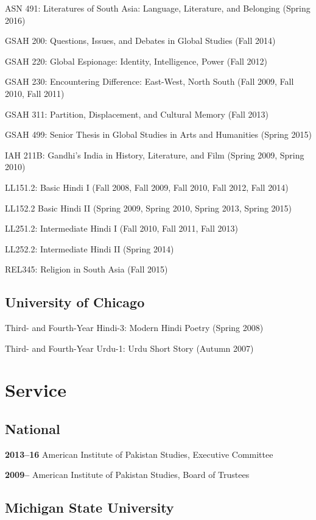 \documentclass[letterpaper,12pt]{article}
\begin{document}
ASN 491: Literatures of South Asia: Language, Literature, and Belonging (Spring 2016)

GSAH 200: Questions, Issues, and Debates in Global Studies (Fall 2014)

GSAH 220: Global Espionage: Identity, Intelligence, Power (Fall 2012)

GSAH 230: Encountering Difference: East-West, North South (Fall 2009, Fall 2010, Fall 2011)

GSAH 311: Partition, Displacement, and Cultural Memory (Fall 2013)

GSAH 499: Senior Thesis in Global Studies in Arts and Humanities (Spring 2015)

IAH 211B: Gandhi’s India in History, Literature, and Film (Spring 2009, Spring 2010)

LL151.2: Basic Hindi I (Fall 2008, Fall 2009, Fall 2010, Fall 2012, Fall 2014)

LL152.2 Basic Hindi II (Spring 2009, Spring 2010, Spring 2013, Spring 2015)

LL251.2: Intermediate Hindi I (Fall 2010, Fall 2011, Fall 2013)

LL252.2: Intermediate Hindi II (Spring 2014)

REL345: Religion in South Asia (Fall 2015)


\subsection{University of Chicago%
  \label{university-of-chicago}%
}

Third- and Fourth-Year Hindi-3: Modern Hindi Poetry (Spring 2008)

Third- and Fourth-Year Urdu-1: Urdu Short Story (Autumn 2007)


\section{Service%
  \label{service}%
}


\subsection{National%
  \label{national}%
}

\textbf{2013–16}
American Institute of Pakistan Studies, Executive Committee

\textbf{2009–}
American Institute of Pakistan Studies, Board of Trustees


\subsection{Michigan State University%
  \label{id2}%
}
\end{document}

